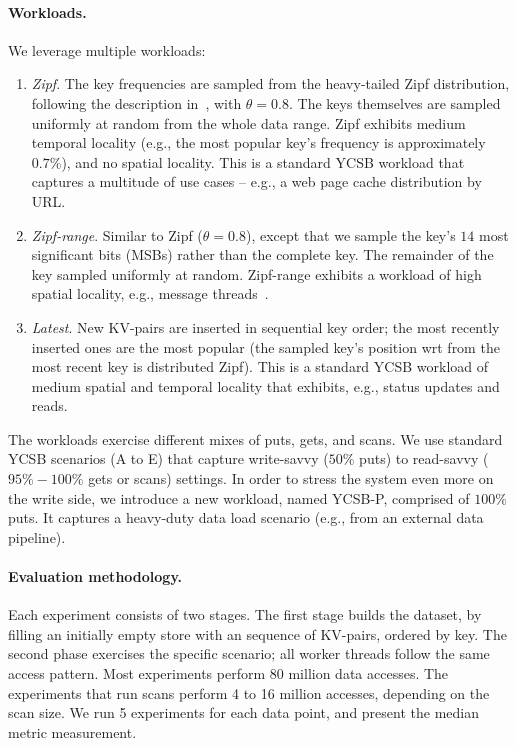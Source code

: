 \paragraph{Workloads.} We leverage multiple workloads: 

\begin{enumerate}
\item {\em Zipf}. The key frequencies are sampled from the heavy-tailed Zipf distribution, 
following the description in~\cite{Gray:1994:QGB:191839.191886}, with $\theta = 0.8$. 
The keys themselves are sampled uniformly at random from the whole data range. Zipf exhibits 
medium temporal locality (e.g., the most popular key's frequency is approximately $0.7\%$), 
and no spatial locality. This is a standard YCSB workload that captures a multitude of use cases 
-- e.g., a web page cache distribution by URL. 

\item {\em Zipf-range}. Similar to Zipf ($\theta=0.8$), except that we sample the key's $14$ most significant bits
(MSBs) rather than the complete key. The remainder of the key sampled uniformly at random. Zipf-range exhibits
a workload of high spatial locality, e.g., message threads~\cite{Borthakur:2011:AHG:1989323.1989438}. 

\item {\em Latest}. New KV-pairs are inserted in sequential key order; the most recently inserted ones are 
the  most popular (the sampled key's position wrt from the most recent key is distributed Zipf). This is a 
standard YCSB workload of medium spatial and temporal locality that exhibits, e.g., status updates and reads. 

\end{enumerate}

The workloads exercise different mixes of puts, gets, and scans. We use standard YCSB scenarios 
(A to E) that capture write-savvy ($50\%$ puts) to read-savvy ($95\%-100\%$ gets or scans) settings. 
In order to stress the system even more on the write side, we introduce a new workload, named 
YCSB-P, comprised of $100\%$ puts. It captures a heavy-duty data load scenario (e.g., from an 
external data pipeline). 

\paragraph{Evaluation methodology.} Each experiment consists of two stages. The first stage builds 
the dataset, by filling an initially empty store with an sequence of KV-pairs, ordered by key. The second 
phase exercises the specific scenario; all worker threads follow the same access pattern. Most experiments 
perform 80 million data accesses. The experiments that run scans perform 4 to 16 million accesses, depending 
on the scan size. We run 5 experiments for each data point, and present the median metric measurement. 

